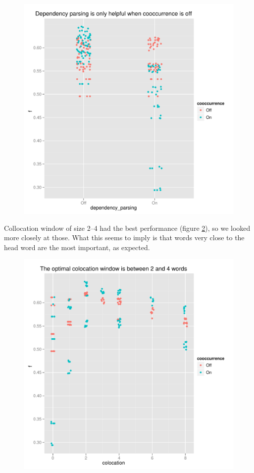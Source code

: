 \documentclass{article}
\begin{document}
\begin{figure}
\includegraphics[width=\textwidth]{pg_0001}
\caption{\label{fig1}}
\end{figure}

Collocation window of size 2--4 had the best performance (figure
\ref{fig2}), so we looked more closely at those. What this seems to
imply is that words very close to the head word are the most
important, as expected.

\begin{figure}
\includegraphics[width=\textwidth]{pg_0002}
\caption{\label{fig2}}
\end{figure}
\end{document}
